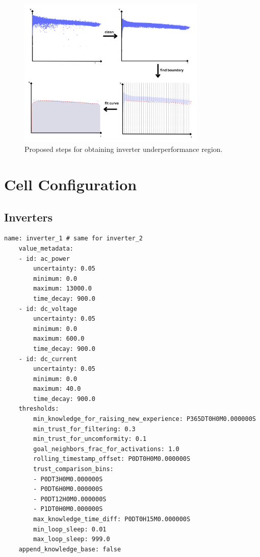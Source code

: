 \begin{figure}[h!]
    \centering
    \includegraphics[width=0.8\textwidth]{figures/chapter5/algorithm/plugin_steps.pdf}
    \caption{Proposed steps for obtaining inverter underperformance region.}
    \label{fig:pluginsteps}
\end{figure}

\FloatBarrier

\section{Cell Configuration}  \label{ap2:cellconfig}

\subsection{Inverters}

\begin{lstlisting}[style=yaml]
    name: inverter_1 # same for inverter_2
    value_metadata:
    - id: ac_power
        uncertainty: 0.05
        minimum: 0.0
        maximum: 13000.0
        time_decay: 900.0
    - id: dc_voltage
        uncertainty: 0.05
        minimum: 0.0
        maximum: 600.0
        time_decay: 900.0
    - id: dc_current
        uncertainty: 0.05
        minimum: 0.0
        maximum: 40.0
        time_decay: 900.0
    thresholds:
        min_knowledge_for_raising_new_experience: P365DT0H0M0.000000S
        min_trust_for_filtering: 0.3
        min_trust_for_uncomformity: 0.1
        goal_neighbors_frac_for_activations: 1.0
        rolling_timestamp_offset: P0DT0H0M0.000000S
        trust_comparison_bins:
        - P0DT3H0M0.000000S
        - P0DT6H0M0.000000S
        - P0DT12H0M0.000000S
        - P1DT0H0M0.000000S
        max_knowledge_time_diff: P0DT0H15M0.000000S
        min_loop_sleep: 0.01
        max_loop_sleep: 999.0
    append_knowledge_base: false
\end{lstlisting}

